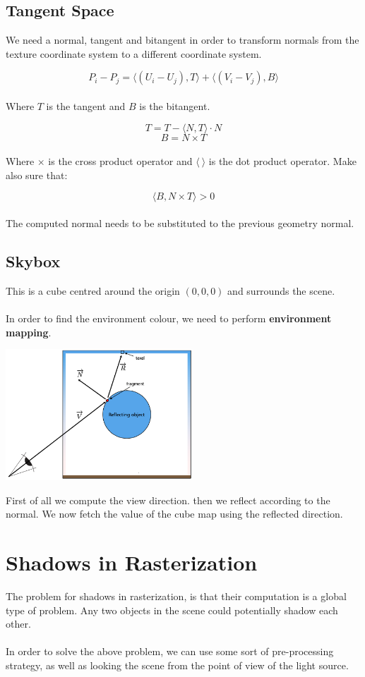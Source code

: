 \documentclass{article}
\begin{document}
\subsection{Tangent Space}
We need a normal, tangent and bitangent in order to transform normals from the texture coordinate system to a different coordinate system.

\[ P_i - P_j = \langle (U_i - U_j), T \rangle + \langle (V_i - V_j), B \rangle \] \\
Where $T$ is the tangent and $B$ is the bitangent.

\[ T = T - \langle N, T \rangle \cdot N \]
\[ B = N \times T \] \\
Where $\times$ is the cross product operator and $\langle ~ \rangle$ is the dot product operator. Make also sure that:

\[ \langle B, N \times T \rangle > 0 \] \\
The computed normal needs to be substituted to the previous geometry normal.

\subsection{Skybox}
This is a cube centred around the origin $(0,0,0)$ and surrounds the scene. \\ \\
In order to find the environment colour, we need to perform \textbf{environment mapping}.

\begin{center}
	\includegraphics[width=7cm]{skybox.png}
\end{center}
\vspace{.3cm}
First of all we compute the view direction. then we reflect according to the normal. We now fetch the value of the cube map using the reflected direction.

\section{Shadows in Rasterization}
The problem for shadows in rasterization, is that their computation is a global type of problem. Any two objects in the scene could potentially shadow each other. \\ \\
In order to solve the above problem, we can use some sort of pre-processing strategy, as well as looking the scene from the point of view of the light source.
\end{document}
